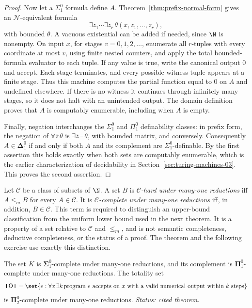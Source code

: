 \begin{proof}
Now let a \(\Sigma^0_1\) formula define \(A\).
Theorem~\ref{thm:prefix-normal-form} gives an \(\mathcal N\)-equivalent
formula
\[
 \exists z_1\cdots\exists z_r\,\theta(x,z_1,\ldots,z_r),
\]
with bounded \(\theta\).  A vacuous existential can be added if
needed, since \(\N\) is nonempty.  On input \(x\), for stages
\(v=0,1,2,\ldots\), enumerate all \(r\)-tuples with every coordinate
at most \(v\), using finite nested counters, and apply the total
bounded-formula evaluator to each tuple.  If any value is true,
write the canonical output \(0\) and accept.  Each stage terminates,
and every possible witness tuple appears at a finite stage.
Thus this machine computes the partial function equal to \(0\)
on \(A\) and undefined elsewhere.  If there is no witness it
continues through infinitely many stages, so it does not halt
with an unintended output.  The domain definition proves that
\(A\) is computably enumerable, including when \(A\) is empty.

Finally, negation interchanges the \(\Sigma^0_1\) and
\(\Pi^0_1\) definability classes: in prefix form,
the negation of \(\forall\bar z\,\theta\) is
\(\exists\bar z\,\neg\theta\), with bounded matrix, and conversely.
Consequently \(A\in\boldsymbol{\Delta}^0_1\) if and only if
both \(A\) and its complement are \(\Sigma^0_1\)-definable.
By the first assertion this holds exactly when both sets are
computably enumerable, which is the earlier characterization
of decidability in Section~\ref{sec:turing-machines-03}.
This proves the second assertion.
\end{proof}

\begin{definition}
Let \(\mathcal C\) be a class of subsets of \(\N\).  A set \(B\) is
\emph{\(\mathcal C\)-hard under many-one reductions} iff
\(A\leq_m B\) for every \(A\in\mathcal C\).  It is
\emph{\(\mathcal C\)-complete under many-one reductions} iff, in addition,
\(B\in\mathcal C\).  This term is required to distinguish an upper-bound
classification from the uniform lower bound used in the next theorem.  It is
a property of a set relative to \(\mathcal C\) and \(\leq_m\), and is not
semantic completeness, deductive completeness, or the status of a proof.
The theorem and the following exercise use exactly this distinction.
\end{definition}

\begin{theorem}
The set \(K\) is \(\boldsymbol{\Sigma}^0_1\)-complete under many-one
reductions, and its complement is \(\boldsymbol{\Pi}^0_1\)-complete under
many-one reductions.  The totality set
\[
  \mathsf{TOT}=\set{e:\forall x\,\exists k\,
  \text{program }e\text{ accepts on }x\text{ with a valid numerical output}
  \text{ within }k\text{ steps}}
\]
is \(\boldsymbol{\Pi}^0_2\)-complete under many-one reductions.
\textit{Status: cited theorem.}
\end{theorem}

